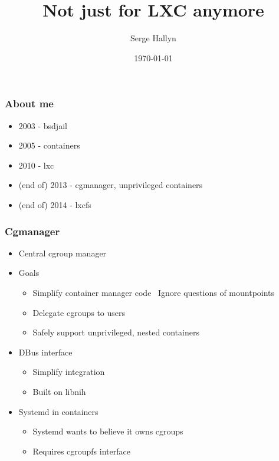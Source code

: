 \documentclass{beamer}
\title[LXCFS]{Not just for LXC anymore} %
\author{Serge Hallyn} %
\institute{LXC project}
\date{\today} %
\begin{document}
\begin{frame}
\titlepage %
\end{frame}

\begin{frame}[fragile]
\frametitle{About me}
\begin{itemize}
\item 2003 - bsdjail
\item 2005 - containers
\item 2010 - lxc
\item (end of) 2013 - cgmanager, unprivileged containers
\item (end of) 2014 - lxcfs
\end{itemize}
\end{frame}

\begin{frame}[fragile]
\frametitle{Cgmanager}
	\begin{itemize}
	\item Central cgroup manager
	\item Goals
		\begin{itemize}
		\item Simplify container manager code \
			Ignore questions of mountpoints
		\item Delegate cgroups to users
		\item Safely support unprivileged, nested containers
		\end{itemize}
	\item DBus interface
		\begin{itemize}
		\item Simplify integration
		\item Built on libnih
		\end{itemize}
\pause

	\item Systemd in containers
		\begin{itemize}
		\item Systemd wants to believe it owns cgroups
		\item Requires cgroupfs interface
		\end{itemize}
	\end{itemize}
\end{frame}
\end{document}
